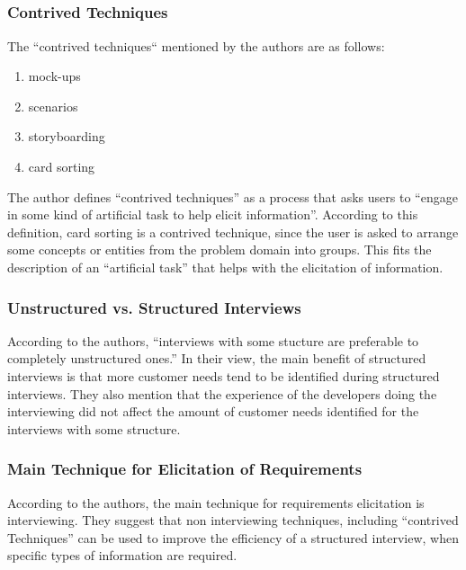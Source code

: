 \documentclass[letterpaper,12pt]{article}
\begin{document}
\subsection{}

\subsubsection{Contrived Techniques}
The ``contrived techniques`` mentioned by the authors are as follows:
\begin{enumerate}
 \item mock-ups
 \item scenarios
 \item storyboarding
 \item card sorting
\end{enumerate}
The author defines ``contrived techniques'' as a process that asks users to
``engage in some kind of artificial task to help elicit information''. According
to this definition, card sorting is a contrived technique, since the user is
asked to arrange some concepts or entities from the problem domain into groups.
This fits the description of an ``artificial task'' that helps with the
elicitation of information.

\subsubsection{Unstructured vs. Structured Interviews}

According to the authors, ``interviews with some stucture are preferable to
completely unstructured ones.'' In their view, the main benefit of  structured
interviews is that more customer needs tend to be identified during structured
interviews. They also mention that the experience of the developers doing the
interviewing did not affect the amount of customer needs identified for the
interviews with some structure.


\subsubsection{Main Technique for Elicitation of Requirements}

According to the authors, the main technique for requirements elicitation is
interviewing. They suggest that non interviewing techniques, including
``contrived Techniques'' can be used to improve the efficiency of
a structured interview, when specific types of information are
required.
\end{document}
